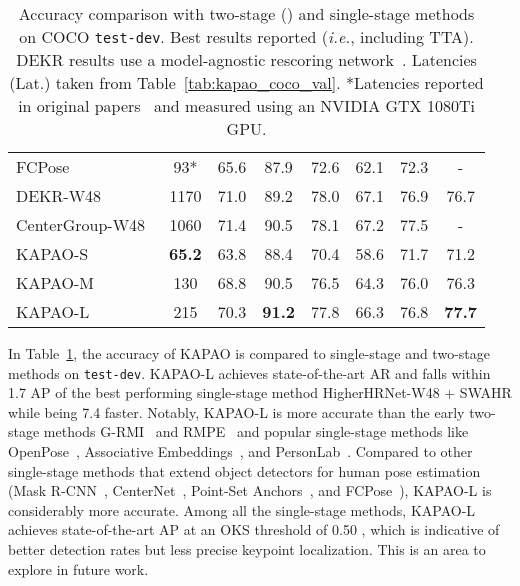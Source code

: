 \documentclass[runningheads]{llncs}
\newcommand{\ie}{\textit{i.e.}}
\newcommand\hll[1]{\bgroup
  \hskip0pt\color{black}#1\egroup
}
\newcommand\hlll[1]{\bgroup
  \hskip0pt\color{black}#1\egroup
}
\begin{document}
\begin{table}[t!]
\begin{tabular}{l|c|c|c|c|c|c|c}
	\hll{FCPose~\cite{mao2021fcpose}} & 93* & 65.6 & 87.9 & 72.6 & 62.1 & 72.3 & - \\
	DEKR-W48~\cite{geng2021bottom} & 1170 & 71.0 & 89.2 & 78.0 & 67.1 & 76.9 & 76.7\\
	\hll{CenterGroup-W48~\cite{braso2021center}} & 1060 & 71.4 & 90.5 & 78.1 & 67.2 & 77.5 & - \\
	KAPAO-S & \textbf{65.2} & 63.8 & 88.4 & 70.4 & 58.6 & 71.7 & 71.2 \\
	KAPAO-M & 130 & 68.8 & 90.5 & 76.5 & 64.3 & 76.0 & 76.3 \\
	KAPAO-L & 215 & 70.3 & \textbf{91.2} & 77.8 & 66.3 & 76.8 & \textbf{77.7} \\
	\hline
\end{tabular}
\smallskip
\caption[KAPAO compared to state-of-the-art two-stage and single-stage methods on COCO \texttt{test-dev}.]{Accuracy comparison with two-stage () and single-stage methods on COCO \texttt{test-dev}. Best results \hlll{reported} (\ie, including TTA). DEKR results use a model-agnostic rescoring network~\cite{geng2021bottom}. \hll{Latencies (Lat.) taken from Table~\ref{tab:kapao_coco_val}. *Latencies reported in original papers~\cite{cao2018openpose, mao2021fcpose} and measured using an NVIDIA GTX 1080Ti GPU.}}
\label{tab:kapao_coco_test}
\end{table}

In Table~\ref{tab:kapao_coco_test}, the accuracy of KAPAO is compared to single-stage and two-stage methods on \texttt{test-dev}. KAPAO-L achieves state-of-the-art AR and falls within \hll{1.7 AP of \hlll{the} best performing single-stage method HigherHRNet-W48 + SWAHR while being 7.4 faster. Notably, KAPAO-L is more accurate than the early two-stage methods G-RMI~\cite{papandreou2017towards} and RMPE~\cite{fang2017rmpe} and \hlll{popular} single-stage methods like OpenPose~\cite{cao2017realtime, cao2018openpose}, Associative Embeddings~\cite{newell2017associative}, and PersonLab~\cite{papandreou2018personlab}. Compared to other single-stage methods that extend object detectors for human pose estimation (Mask R-CNN~\cite{he2017mask}, CenterNet~\cite{zhou2019objects}, Point-Set Anchors~\cite{wei2020point}, and FCPose~\cite{mao2021fcpose}), KAPAO-L is considerably more accurate. Among all the single-stage methods, KAPAO-L achieves state-of-the-art AP at an OKS threshold of 0.50}, which is indicative of better detection rates but less precise keypoint localization. This is an area to explore in future work.
\end{document}
